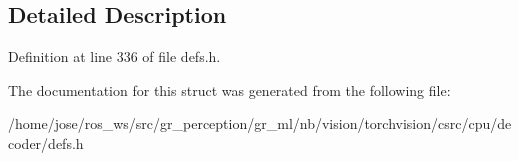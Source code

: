 \subsection{Detailed Description}


Definition at line 336 of file defs.\+h.



The documentation for this struct was generated from the following file\+:\begin{DoxyCompactItemize}
\item 
/home/jose/ros\+\_\+ws/src/gr\+\_\+perception/gr\+\_\+ml/nb/vision/torchvision/csrc/cpu/decoder/defs.\+h\end{DoxyCompactItemize}

